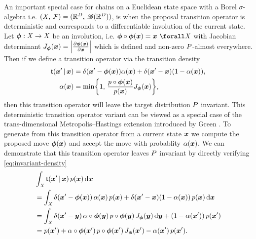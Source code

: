 An important special case for chains on a Euclidean state space with a Borel $\sigma$-algebra i.e. $(\mathit{X},\,\mathcal{F}) = (\mathbb{R}^D, \, \mathscr{B}(\mathbb{R}^D))$, is when the proposal transition operator is deterministic and corresponds to a differentiable involution of the current state. Let $\boldsymbol{\phi} : \mathit{X} \to \mathit{X}$ be an involution, i.e. $\vct{\phi} \circ \vct{\phi}(\vct{x}) = \vct{x} ~\forall \set{X}$ with Jacobian determinant $J_{\vct{\phi}}(\vct{x}) = \left|\pd{\vct{\phi}(\vct{x})}{\vct{x}}\right|$ which is defined and non-zero $P$-almost everywhere. Then if we define a transition operator via the transition density
\begin{equation}\label{eq:metropolis-hastings-transition-deterministic-proposal}
\begin{split}
  \trans(\vct{x}' \gvn \vct{x}) &=
  \delta\lpa\vct{x}' - \vct{\phi}(\vct{x})\rpa \alpha(\vct{x}) +
  \delta(\vct{x}' - \vct{x}) \lpa 1 - \alpha(\vct{x}) \rpa,
  \\
  \alpha(\vct{x}) &=
  \min\lbr 
    1,\,\frac{\tgtdens \circ \vct{\phi}(\vct{x})}{\tgtdens(\vct{x})} J_{\vct{\phi}}(\vct{x})
  \rbr,
\end{split}
\end{equation}
then this transition operator will leave the target distribution $P$ invariant. This deterministic transition operator variant can be viewed as a special case of the trans-dimensional Metropolis--Hastings extension introduced by Green \citep{green1995reversible,geyer2003metropolis}. To generate from this transition operator from a current state $\boldsymbol{x}$ we compute the proposed move $\boldsymbol{\phi}(\boldsymbol{x})$ and accept the move with probablity $\alpha(\boldsymbol{x})$. We can demonstrate that this transition operator leaves $P$ invariant by directly verifying \eqref{eq:invariant-density}
\begin{align}
  \label{eq:mh-det-proposal-derivation-1}
  &\int_{\set{X}} \trans(\vct{x}' \gvn \vct{x}) \, \tgtdens(\vct{x}) \,\dr\vct{x}
  \\
  \label{eq:mh-det-proposal-derivation-2}
  &=
  \int_{\set{X}} 
    \delta\lpa\vct{x}' - \vct{\phi}(\vct{x})\rpa \,\alpha(\vct{x}) \, \tgtdens(\vct{x}) +
    \delta(\vct{x}' - \vct{x}) \lpa 1 - \alpha(\vct{x}) \rpa \, \tgtdens(\vct{x})
  \,\dr\vct{x}
  \\
  \label{eq:mh-det-proposal-derivation-3}
  &=
  \int_{\set{X}} 
    \delta\lpa\vct{x}' - \vct{y}\rpa \,\alpha\circ\vct{\phi}(\vct{y}) \, 
    \tgtdens\circ\vct{\phi}(\vct{y}) \, J_{\vct{\phi}}(\vct{y}) \,\dr\vct{y} +
  \lpa 1 - \alpha(\vct{x}') \rpa \, \tgtdens(\vct{x}')
  \\
  \label{eq:mh-det-proposal-derivation-4}
  &=
  p(\vct{x}') +
  \alpha\circ\vct{\phi}(\vct{x}') \, \tgtdens\circ\vct{\phi}(\vct{x}') \, 
  J_{\vct{\phi}}(\vct{x}') -
  \alpha(\vct{x}') \, \tgtdens(\vct{x}').
\end{align}

